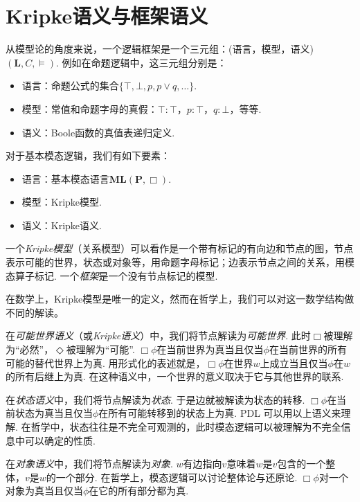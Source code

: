 \section{Kripke语义与框架语义}

从模型论的角度来说，一个逻辑框架是一个三元组：(语言，模型，语义) $(\mathbf L,C,\vDash)$. 例如在命题逻辑中，这三元组分别是：
\begin{itemize}
    \item 语言：命题公式的集合$\{\top,\bot,p,p\vee q,\dots\}$.
    \item 模型：常值和命题字母的真假：$\top:\top$，$p:\top$，$q:\bot$，等等.
    \item 语义：Boole函数的真值表递归定义.
\end{itemize}

对于基本模态逻辑，我们有如下要素：
\begin{itemize}
    \item 语言：基本模态语言$\mathbf{ML}(\mathbf P, \Box)$.
    \item 模型：Kripke模型.
    \item 语义：Kripke语义.
\end{itemize}

一个\emph{Kripke模型}（关系模型）可以看作是一个带有标记的有向边和节点的图，节点表示可能的世界，状态或对象等，用命题字母标记；边表示节点之间的关系，用模态算子标记. 一个\emph{框架}是一个没有节点标记的模型.

在数学上，Kripke模型是唯一的定义，然而在哲学上，我们可以对这一数学结构做不同的解读。

在\emph{可能世界语义}（或\emph{Kripke语义}）中，我们将节点解读为\emph{可能世界}. 此时$\Box$被理解为“必然”，$\Diamond$被理解为“可能”. $\Box\phi$在当前世界为真当且仅当$\phi$在当前世界的所有可能的替代世界上为真. 用形式化的表述就是，$\Box\phi$在世界$w$上成立当且仅当$\phi$在$w$的所有后继上为真. 在这种语义中，一个世界的意义取决于它与其他世界的联系.

在\emph{状态语义}中，我们将节点解读为\emph{状态}. 于是边就被解读为状态的转移. $\Box\phi$在当前状态为真当且仅当$\phi$在所有可能转移到的状态上为真. PDL 可以用以上语义来理解. 在哲学中，状态往往是不完全可观测的，此时模态逻辑可以被理解为不完全信息中可以确定的性质.

在\emph{对象语义}中，我们将节点解读为\emph{对象}. $w$有边指向$v$意味着$w$是$v$包含的一个整体，$v$是$w$的一个部分. 在哲学上，模态逻辑可以讨论整体论与还原论. $\Box\phi$对一个对象为真当且仅当$\phi$在它的所有部分都为真.

